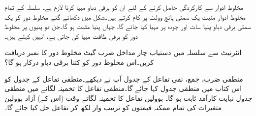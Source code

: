 مخلوط ادوار سے کارکردگی حاصل کرنے کے لئے ان کو برقی دباو مہیا کرنا لازم ہے۔ سلسلہ  کے تمام مخلوط ادوار مثبت یک سمتی پانچ وولٹ  پر کام کرتے ہیں۔شکل  میں دکھائے گئے مخلوط دور کو یک سمتی برقی دباو پنیا سات  اور چودہ  پر مہیا کیا جائے گا، جہاں پنیا  مثبت ہو گا۔جن دو پنیوں پر مخلوط دور کو برقی طاقت مہیا کی جاتی ہے، انہیں  کہتے ہیں۔

انٹرنیٹ سے سلسلہ  میں دستیاب چار مداخل ضرب گیٹ مخلوط دور کا نمبر دریافت کریں۔اس مخلوط دور کو کتنا برقی دباو درکار ہو گا؟

منطقی ضرب، جمع، نفی تفاعل کے جدول آپ نے دیکھے۔منطقی تفاعل کے جدول کو اس کتاب میں منطقی جدول کہا جائے گا۔منطقی تفاعل کا تخمینہ لگانے میں منطقی جدول نہایت کارآمد ثابت ہو گا۔
بوولین تفاعل کا تخمینہ لگاتے وقت (اس کے) آزاد بوولین متغیرات کی تمام ممکنہ قیمتوں کو ترتیب وار لکھ کر تفاعل حل کیا جائے گا۔


